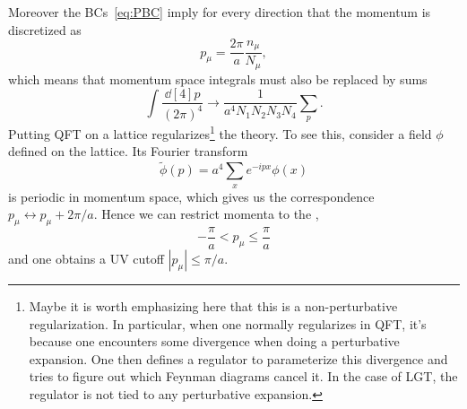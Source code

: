 Moreover the BCs~\eqref{eq:PBC} imply for every direction
that the momentum is discretized as
\begin{equation}
  p_\mu=\frac{2\pi}{a}\frac{n_\mu}{N_\mu},
\end{equation}
which means that momentum space integrals must also be replaced by
sums
\begin{equation}
  \int\frac{\dd[4]{p}}{(2\pi)^4}\to
  \frac{1}{a^4N_1N_2N_3N_4}\sum_p. 
\end{equation}
Putting QFT on a lattice regularizes\footnote{Maybe it is worth
emphasizing here that this is a non-perturbative regularization. 
In particular, when one normally regularizes in QFT, it's because
one encounters some divergence when doing a perturbative
expansion. One then defines a regulator to parameterize this
divergence and tries to figure out which Feynman diagrams 
cancel it. In the case of LGT, the regulator is not tied to
any perturbative expansion.} the theory. 
To see this, consider a field $\phi$ defined on the lattice. 
Its Fourier transform
\begin{equation}\label{eq:fourierLat}
  \widetilde{\phi}(p)=a^4\sum_xe^{-ipx}\phi(x)
\end{equation}
is periodic in momentum space, which gives us the correspondence
$p_\mu\leftrightarrow p_\mu+2\pi/a$. Hence we can restrict
momenta to the ,
\begin{equation}
 -\frac{\pi}{a}<p_\mu\le\frac{\pi}{a}
\end{equation}
and one obtains a UV cutoff $|p_\mu|\le\pi/a$.

